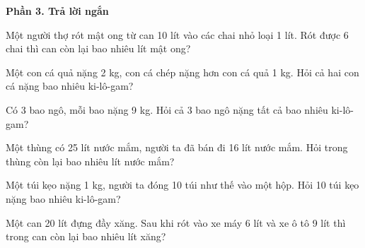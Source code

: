 \textbf{Phần 3. Trả lời ngắn}

\begin{ex} %
Một người thợ rót mật ong từ can 10 lít vào các chai nhỏ loại 1 lít. Rót được 6 chai thì can còn lại bao nhiêu lít mật ong?
\end{ex}

\begin{ex} %
Một con cá quả nặng 2 kg, con cá chép nặng hơn con cá quả 1 kg. Hỏi cả hai con cá nặng bao nhiêu ki-lô-gam?
\end{ex}

\begin{ex} %
Có 3 bao ngô, mỗi bao nặng 9 kg. Hỏi cả 3 bao ngô nặng tất cả bao nhiêu ki-lô-gam?
\end{ex}

\begin{ex} %
Một thùng có 25 lít nước mắm, người ta đã bán đi 16 lít nước mắm. Hỏi trong thùng còn lại bao nhiêu lít nước mắm?
\end{ex}

\begin{ex} %
Một túi kẹo nặng 1 kg, người ta đóng 10 túi như thế vào một hộp. Hỏi 10 túi kẹo nặng bao nhiêu ki-lô-gam?
\end{ex}

\begin{ex} %
Một can 20 lít đựng đầy xăng. Sau khi rót vào xe máy 6 lít và xe ô tô 9 lít thì trong can còn lại bao nhiêu lít xăng?
\end{ex}
